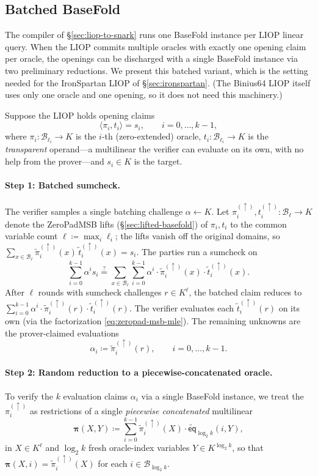 \documentclass{article}
\theoremstyle{definition}
\newcommand*{\mle}{\widetilde}
\newcommand{\eq}{\mathsf{eq}}
\newcommand{\BB}{\mathcal{B}}
\begin{document}
\subsection{Batched BaseFold}
\label{sec:batched-basefold}

The compiler of \S\ref{sec:liop-to-snark} runs one BaseFold instance per LIOP linear query. When the LIOP commits multiple oracles with exactly one opening claim per oracle, the openings can be discharged with a single BaseFold instance via two preliminary reductions. We present this batched variant, which is the setting needed for the IronSpartan LIOP of \S\ref{sec:ironspartan}. (The Binius64 LIOP itself uses only one oracle and one opening, so it does not need this machinery.)

Suppose the LIOP holds opening claims
\[
  \langle \pi_i, t_i \rangle = s_i, \qquad i = 0, \ldots, k - 1,
\]
where $\pi_i \colon \BB_{\ell_i} \to K$ is the $i$-th (zero-extended) oracle, $t_i \colon \BB_{\ell_i} \to K$ is the \emph{transparent} operand---a multilinear the verifier can evaluate on its own, with no help from the prover---and $s_i \in K$ is the target.

\paragraph{Step 1: Batched sumcheck.}
The verifier samples a single batching challenge $\alpha \gets K$. Let $\pi_i^{(\uparrow)}, t_i^{(\uparrow)} \colon \BB_{\boldsymbol{\ell}} \to K$ denote the ZeroPadMSB lifts (\S\ref{sec:lifted-basefold}) of $\pi_i, t_i$ to the common variable count $\boldsymbol{\ell} \coloneqq \max_i \ell_i$; the lifts vanish off the original domains, so $\sum_{x \in \BB_{\boldsymbol{\ell}}} \mle{\pi}_i^{(\uparrow)}(x)\, \mle{t}_i^{(\uparrow)}(x) = s_i$. The parties run a sumcheck on
\[
  \sum_{i = 0}^{k - 1} \alpha^i s_i \stackrel{?}{=} \sum_{x \in \BB_{\boldsymbol{\ell}}} \sum_{i = 0}^{k - 1} \alpha^i \cdot \mle{\pi}_i^{(\uparrow)}(x) \cdot \mle{t}_i^{(\uparrow)}(x).
\]
After $\boldsymbol{\ell}$ rounds with sumcheck challenges $r \in K^{\boldsymbol{\ell}}$, the batched claim reduces to $\sum_{i = 0}^{k - 1} \alpha^i \cdot \mle{\pi}_i^{(\uparrow)}(r) \cdot \mle{t}_i^{(\uparrow)}(r)$. The verifier evaluates each $\mle{t}_i^{(\uparrow)}(r)$ on its own (via the factorization \eqref{eq:zeropad-msb-mle}). The remaining unknowns are the prover-claimed evaluations
\[
  \alpha_i \coloneqq \mle{\pi}_i^{(\uparrow)}(r), \qquad i = 0, \ldots, k - 1.
\]

\paragraph{Step 2: Random reduction to a piecewise-concatenated oracle.}
To verify the $k$ evaluation claims $\alpha_i$ via a single BaseFold instance, we treat the $\pi_i^{(\uparrow)}$ as restrictions of a single \emph{piecewise concatenated} multilinear
\[
  \boldsymbol{\pi}(X, Y) \coloneqq \sum_{i = 0}^{k - 1} \mle{\pi}_i^{(\uparrow)}(X) \cdot \mle{\eq}_{\log_2 k}(i, Y),
\]
in $X \in K^{\boldsymbol{\ell}}$ and $\log_2 k$ fresh oracle-index variables $Y \in K^{\log_2 k}$, so that $\boldsymbol{\pi}(X, i) = \mle{\pi}_i^{(\uparrow)}(X)$ for each $i \in \BB_{\log_2 k}$.
\end{document}
